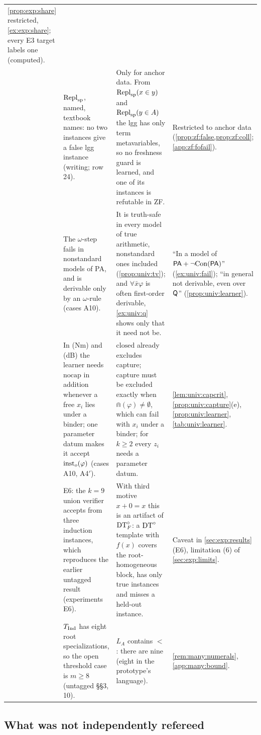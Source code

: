 \begin{longtable}{@{}>{\raggedleft\arraybackslash}p{}>{\raggedright\arraybackslash}p{}>{\raggedright\arraybackslash}p{}>{\raggedright\arraybackslash}p{}@{}}
\cref{prop:exp:share} restricted, \cref{ex:exp:share}; every E3 target labels one (computed).\\
33 & $\mathrm{Repl}_{\mathrm{sp}}$, named, textbook names: no two instances give a false lgg instance (writing; row 24). &
Only for anchor data. From $\mathrm{Repl}_{\mathrm{sp}}(x\in y)$ and $\mathrm{Repl}_{\mathrm{sp}}(y\in A)$ the lgg has only term metavariables, so no
freshness guard is learned, and one of its instances is refutable in ZF. &
Restricted to anchor data (\cref{prop:zf:false,prop:zf:coll}; \cref{app:zf:fofail}).\\
34 & The $\omega$-step fails in nonstandard models of PA, and is derivable only by an $\omega$-rule (cases A10). &
It is truth-safe in every model of true arithmetic, nonstandard ones included (\cref{prop:univ:tv}); and
$\forall\bar x\varphi$ is often first-order derivable, \cref{ex:univ:q} shows only that it need not be. &
``In a model of $\mathsf{PA}+\neg\mathrm{Con}(\mathsf{PA})$'' (\cref{ex:univ:fail}); ``in general not derivable, even over $\mathsf{Q}$''
(\cref{prop:univ:learner}).\\
35 & In (Nm) and (dB) the learner needs $\mathrm{nocap}$ in addition whenever a free $x_i$ lies under a binder; one
parameter datum makes it accept $\mathrm{inst}_{o}(\varphi)$ (cases A10, A4$'$). &
$\mathrm{closed}$ already excludes capture; capture must be excluded exactly when $\Cap(\varphi)\neq\emptyset$, which can
fail with $x_i$ under a binder; for $k\ge2$ every $z_i$ needs a parameter datum. &
\cref{lem:univ:capcrit}, \cref{prop:univ:capture}(e), \cref{prop:univ:learner}, \cref{tab:univ:learner}.\\
36 & E6: the $k=9$ union verifier accepts from three induction instances, which reproduces the earlier untagged result
(experiments E6). &
With third motive $x+0=x$ this is an artifact of $\mathrm{DT}^{\circ}_{F}$: a $\mathrm{DT}^{\circ}$ template with $f(x)$ covers the root-homogeneous block,
has only true instances and misses a held-out instance. &
Caveat in \cref{sec:exp:results} (E6), limitation (6) of \cref{sec:exp:limits}.\\
37 & $T_{\mathrm{Ind}}$ has eight root specializations, so the open threshold case is $m\ge8$ (untagged \S\S3, 10). &
$L_A$ contains $<$: there are nine (eight in the prototype's language). &
\cref{rem:many:numerals}, \cref{app:many:bound}.\\
\end{longtable}
\endgroup

\subsection{What was not independently refereed}\label{app:ver:unref}

